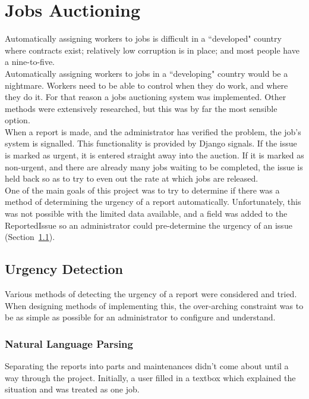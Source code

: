 \chapter{Jobs Auctioning}
Automatically assigning workers to jobs is difficult in a ``developed" country where contracts exist; relatively low corruption is in place; and most people have a nine-to-five. \\

Automatically assigning workers to jobs in a ``developing" country would be a nightmare. Workers need to be able to control when they do work, and where they do it. For that reason a jobs auctioning system was implemented. Other methods were extensively researched, but this was by far the most sensible option. \\

When a report is made, and the administrator has verified the problem, the job's system is signalled. This functionality is provided by Django signals. If the issue is marked as urgent, it is entered straight away into the auction. If it is marked as non-urgent, and there are already many jobs waiting to be completed, the issue is held back so as to try to even out the rate at which jobs are released. \\

One of the main goals of this project was to try to determine if there was a method of determining the urgency of a report automatically. Unfortunately, this was not possible with the limited data available, and a field was added to the ReportedIssue so an administrator could pre-determine the urgency of an issue (Section~\ref{sec:jm:urgency}).

\section{Urgency Detection}
\label{sec:jm:urgency}

Various methods of detecting the urgency of a report were considered and tried. When designing methods of implementing this, the over-arching constraint was to be as simple as possible for an administrator to configure and understand. \\

\subsection{Natural Language Parsing}
Separating the reports into parts and maintenances didn't come about until a way through the project. Initially, a user filled in a textbox which explained the situation and was treated as one job. \\

